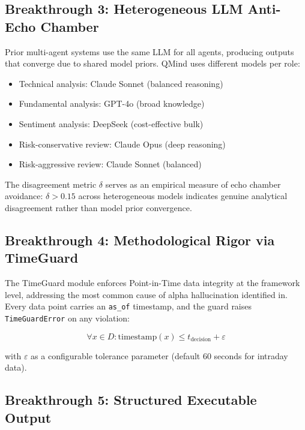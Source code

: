 \documentclass[twocolumn]{article}
\begin{document}
\subsection{Breakthrough 3: Heterogeneous LLM Anti-Echo Chamber}

Prior multi-agent systems\cite{tradingagents2024,findebate2025} use the same LLM for all agents, producing outputs that converge due to shared model priors\cite{llmhumantraders2025}. QMind uses different models per role:
\begin{itemize}
    \item Technical analysis: Claude Sonnet (balanced reasoning)
    \item Fundamental analysis: GPT-4o (broad knowledge)
    \item Sentiment analysis: DeepSeek (cost-effective bulk)
    \item Risk-conservative review: Claude Opus (deep reasoning)
    \item Risk-aggressive review: Claude Sonnet (balanced)
\end{itemize}

The disagreement metric $\delta$ serves as an empirical measure of echo chamber avoidance: $\delta > 0.15$ across heterogeneous models indicates genuine analytical disagreement rather than model prior convergence.

\subsection{Breakthrough 4: Methodological Rigor via TimeGuard}

The TimeGuard module enforces Point-in-Time data integrity at the framework level, addressing the most common cause of alpha hallucination identified in\cite{ye2026alpha}. Every data point carries an \texttt{as\_of} timestamp, and the guard raises \texttt{TimeGuardError} on any violation:

\begin{equation}
\forall x \in D: \text{timestamp}(x) \leq t_{\text{decision}} + \varepsilon
\end{equation}

with $\varepsilon$ as a configurable tolerance parameter (default 60 seconds for intraday data).

\subsection{Breakthrough 5: Structured Executable Output}
\end{document}

